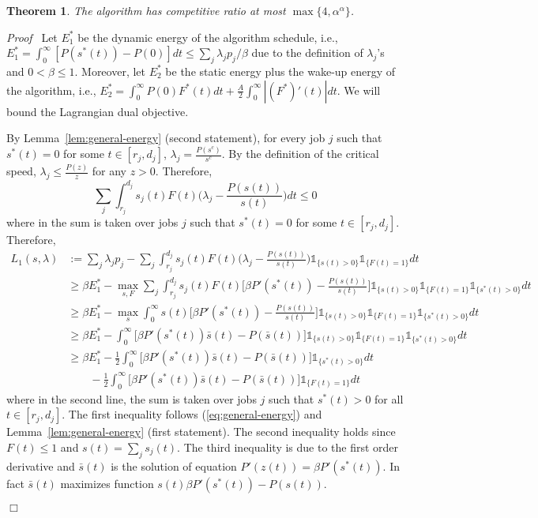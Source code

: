 \documentclass[11pt]{article}
\newenvironment{proof}{\noindent\emph{Proof\ }}{\hspace*{\fill}$\Box$\medskip}
\newtheorem{theorem}{Theorem}
\newcommand{\one}{\ensuremath{\mathds{1}}}
\begin{document}
\begin{theorem}
The algorithm has competitive ratio at most $\max\{4,\alpha^{\alpha}\}$.
\end{theorem}
\begin{proof}
Let $E^{*}_{1}$ be the dynamic energy of the algorithm 
schedule, i.e., $E^{*}_{1} = \int_{0}^{\infty} [P(s^{*}(t)) - P(0)] dt \leq \sum_{j} \lambda_{j}p_{j}/\beta$
due to the definition of $\lambda_{j}$'s and $0 < \beta \leq 1$. 
Moreover, let $E^{*}_{2}$ be the static energy plus the wake-up energy of the algorithm, i.e.,
$E^{*}_{2} = \int_{0}^{\infty} P(0)F^{*}(t)dt +  \frac{A}{2} \int_{0}^{\infty} |(F^{*})'(t)|dt$.
We will bound the Lagrangian dual objective. 

By Lemma~\ref{lem:general-energy} (second statement), 
for every job $j$ such that $s^{*}(t) = 0$ for some $t \in [r_{j},d_{j}]$, 
$\lambda_{j} = \frac{P(s^{c})}{s^{c}}$. By the definition of the critical speed,
$\lambda_{j} \leq \frac{{P}(z)}{z}$ for any $z > 0$. Therefore,
\begin{equation} 	\label{eq:general-energy}
\sum_{j}  \int_{r_{j}}^{d_{j}} s_{j}(t) F(t) \biggl( \lambda_{j} - \frac{{P}(s(t))}{s(t)}\biggl)dt \leq 0
\end{equation}
where in the sum is taken over jobs $j$ such that 
$s^{*}(t) = 0$ for some $t \in [r_{j},d_{j}]$.  Therefore,
\begin{align*}
L_{1}(s,\lambda) &:= \sum_{j} \lambda_{j}p_{j} 
	- \sum_{j}  \int_{r_{j}}^{d_{j}} s_{j}(t) F(t) \biggl( \lambda_{j} - \frac{{P}(s(t))}{s(t)}\biggl) \one_{\{s(t) > 0\}}\one_{\{F(t) = 1\}}dt \\
&\geq \beta E^{*}_{1} - \max_{s,F} \sum_{j} \int_{r_{j}}^{d_{j}} s_{j}(t) F(t) 
		\biggl[ \beta P'(s^{*}(t)) - \frac{{P}(s(t))}{s(t)}\biggl] \one_{\{s(t) > 0\}} \one_{\{F(t) = 1\}} \one_{\{s^{*}(t) > 0\}} dt\\
&\geq \beta E^{*}_{1} - \max_{s} \int_{0}^{\infty} s(t)  
		\biggl[ \beta P'(s^{*}(t)) - \frac{{P}(s(t))}{s(t)}\biggl]  \one_{\{s(t) > 0\}}\one_{\{F(t) = 1\}} \one_{\{s^{*}(t) > 0\}} dt \\
&\geq \beta E^{*}_{1} - \int_{0}^{\infty}  
		\biggl[ \beta P'(s^{*}(t))  \bar{s}(t) - {P}(\bar{s}(t)) \biggl] \one_{\{s(t) > 0\}}\one_{\{F(t) = 1\}}\one_{\{s^{*}(t) > 0\}} dt \\
&\geq \beta E^{*}_{1} - \frac{1}{2} \int_{0}^{\infty}  
		\biggl[ \beta P'(s^{*}(t))  \bar{s}(t) - {P}(\bar{s}(t)) \biggl] \one_{\{s^{*}(t) > 0\}} dt \\
		& \qquad - \frac{1}{2} \int_{0}^{\infty}  
		\biggl[ \beta P'(s^{*}(t))  \bar{s}(t) - {P}(\bar{s}(t)) \biggl] \one_{\{F(t) = 1\}} dt 
\end{align*}
where in the second line, the sum is taken over jobs $j$ such that 
$s^{*}(t) > 0$ for all $t \in [r_{j},d_{j}]$.
The first inequality follows (\ref{eq:general-energy}) and Lemma~\ref{lem:general-energy} (first statement).
The second inequality holds since $F(t) \leq 1$ and $s(t) = \sum_{j} s_{j}(t)$. 
The third inequality is due to the first order derivative 
and $\bar{s}(t)$ is the solution of equation $P'(z(t)) = \beta P'(s^{*}(t))$.
In fact $\bar{s}(t)$ maximizes function $s(t)\beta P'(s^{*}(t)) - {P}(s(t))$.


\end{proof}
\end{document}
